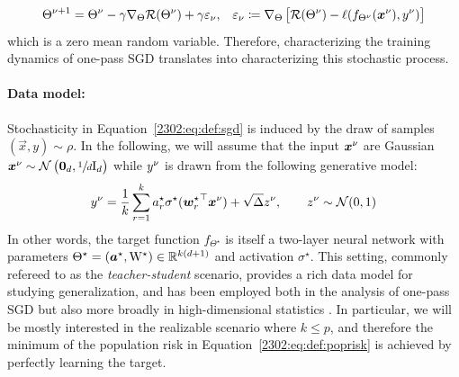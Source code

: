 \begin{align}
\label{2302:eq:sgd:noise}
\Theta^{\nu+1} = \Theta^{\nu} -\gamma\nabla_{\Theta}\mathcal{R}(\Theta^{\nu})+\gamma\varepsilon_{\nu}, && \varepsilon_{\nu} \coloneqq \nabla_{\Theta}\left[\mathcal{R}(\Theta^{\nu}) -\ell(f_{\Theta^{\nu}}({\boldsymbol{x}}^{\nu}),y^{\nu})\right]
\end{align}
which is a zero mean random variable. Therefore, characterizing the training dynamics of one-pass SGD translates into characterizing this stochastic process.

\paragraph{Data model: } Stochasticity in Equation~\eqref{2302:eq:def:sgd} is induced by the draw of samples $(\vec{x}, y)\sim \rho$. In the following, we will assume that the input ${\boldsymbol{x}}^\nu$ are Gaussian ${\boldsymbol{x}}^{\nu}\sim\mathcal{N}\left({\boldsymbol{0}}_{d}, \sfrac{1}{d}\mathrm{I}_{d}\right)$ while $y^\nu$ is drawn from the following generative model:
\begin{align}
\label{2302:eq:target}
y^{\nu} = \frac{1}{k} \sum\limits_{r=1}^{k}a^{\star}_{r}\sigma^{\star}({{\boldsymbol{w}}_{r}^{\star}}^{\top}{\boldsymbol{x}}^{\nu}) + \sqrt{\Delta}z^{\nu},  \qquad z^{\nu}\sim\mathcal{N}(0,1)
\end{align}
In other words, the target function $f_{\Theta^{\star}}$ is itself a two-layer neural network with parameters $\Theta^{\star}=({\boldsymbol{a}}^{\star}, \mathrm{W}^{\star})\in\mathbb{R}^{k(d+1)}$ and activation $\sigma^{\star}$. This setting, commonly refereed to as the \emph{teacher-student} scenario, provides a rich data model for studying generalization, and has been employed both in the analysis of one-pass SGD \citep{saad1996dynamics,goldt2019dynamics,veiga2022phase} but also more broadly in high-dimensional statistics \citep{loureiro2021learning}. In particular, we will be mostly interested in the realizable scenario where $k\leq p$, and therefore the minimum of the population risk in Equation~\eqref{2302:eq:def:poprisk} is achieved by perfectly learning the target.


